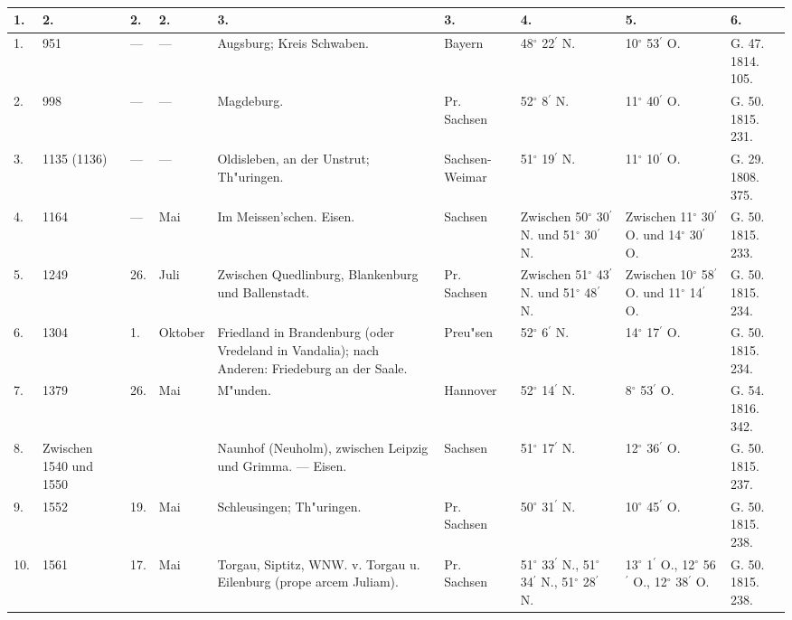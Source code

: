 \documentclass[a4paper, 8pt, oneside, polutonikogreek, german]{article}
\begin{document}
\subsubsection{}
\begin{center}
    \footnotesize
    \begin{longtable}{|p{3mm}|p{10mm}|p{5mm}|p{13mm}|p{25mm}|p{13mm}|p{10mm}|p{10mm}|p{11mm}|}
    \hline
        1. & 2. & 2. & 2. & 3. & 3. & 4. & 5. & 6. \\ \hline
        1. & 951 & --- & --- & Augsburg; Kreis Schwaben. & Bayern & 48$^\circ$ 22$^\prime$ N. & 10$^\circ$ 53$^\prime$ O. & G. 47. 1814. 105. \\ \hline
        2. & 998 & --- & --- & Magdeburg. & Pr. Sachsen & 52$^\circ$ 8$^\prime$ N. & 11$^\circ$ 40$^\prime$ O. & G. 50. 1815. 231. \\ \hline
        3. & 1135 (1136) & --- & --- & Oldisleben, an der Unstrut; Th"uringen. & Sachsen-Weimar & 51$^\circ$ 19$^\prime$ N. & 11$^\circ$ 10$^\prime$ O. & G. 29. 1808. 375. \\ \hline
        4. & 1164 & --- & Mai & Im Meissen’schen. Eisen. & Sachsen & Zwischen 50$^\circ$ 30$^\prime$ N. und 51$^\circ$ 30$^\prime$ N. & Zwischen 11$^\circ$ 30$^\prime$ O. und 14$^\circ$ 30$^\prime$ O. & G. 50. 1815. 233. \\ \hline
        5. & 1249 & 26. & Juli & Zwischen Quedlinburg, Blankenburg und Ballenstadt. & Pr. Sachsen & Zwischen 51$^\circ$ 43$^\prime$ N. und 51$^\circ$ 48$^\prime$ N. & Zwischen 10$^\circ$ 58$^\prime$ O. und 11$^\circ$ 14$^\prime$ O. & G. 50. 1815. 234. \\ \hline
        6. & 1304 & 1. & Oktober & Friedland in Brandenburg (oder Vredeland in Vandalia); nach Anderen: Friedeburg an der Saale. & Preu"sen & 52$^\circ$ 6$^\prime$ N. & 14$^\circ$ 17$^\prime$ O. & G. 50. 1815. 234. \\ \hline
        7. & 1379 & 26. & Mai & M"unden. & Hannover & 52$^\circ$ 14$^\prime$ N. & 8$^\circ$ 53$^\prime$ O. & G. 54. 1816. 342. \\ \hline
        8. & Zwischen 1540 und 1550 & ~ & ~ & Naunhof (Neuholm), zwischen Leipzig und Grimma. --- Eisen. & Sachsen & 51$^\circ$ 17$^\prime$ N. & 12$^\circ$ 36$^\prime$ O. & G. 50. 1815. 237. \\ \hline
        9. & 1552 & 19. & Mai & Schleusingen; Th"uringen. & Pr. Sachsen & 50$^\circ$ 31$^\prime$ N. & 10$^\circ$ 45$^\prime$ O. & G. 50. 1815. 238. \\ \hline
        10. & 1561 & 17. & Mai & Torgau, Siptitz, WNW. v. Torgau u. Eilenburg (prope arcem Juliam). & Pr. Sachsen & 51$^\circ$ 33$^\prime$ N., 51$^\circ$ 34$^\prime$ N., 51$^\circ$ 28$^\prime$ N. & 13$^\circ$ 1$^\prime$ O., 12$^\circ$ 56$^\prime$ O., 12$^\circ$ 38$^\prime$ O. & G. 50. 1815. 238. \\ \hline

\end{longtable}
\end{center}
\end{document}
